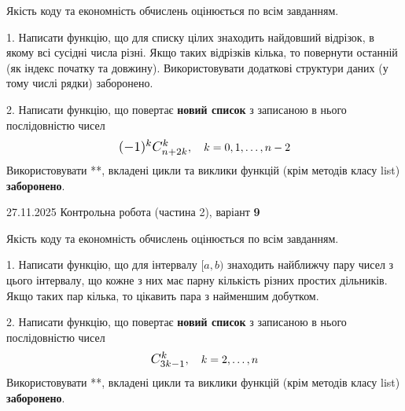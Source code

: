 \documentclass[11pt, ukrainian]{article}
\begin{document}
{{{{{{{%

{
\begin {large}
Якість коду та економність обчислень оцінюється по всім завданням.


1. Написати функцію, що для списку цілих знаходить найдовший відрізок, в якому всі сусідні числа різні. Якщо таких відрізків кілька, то повернути останній (як індекс початку та довжину). Використовувати додаткові структури даних (у тому числі рядки) заборонено.


2. 
Написати функцію, що повертає \textbf{новий список} з записаною в нього послідовністю чисел
$$\scalebox{1.2}{$(-1)^{k}C_{n+2k}^{k}$}, \quad k=0,1,\ldots,n-2$$
Використовувати **, вкладені цикли та виклики функцій (крім методів класу list) \textbf{заборонено}.

\end{large}
\newpage
{{27.11.2025 Контрольна робота  (частина 2), варіант  \No \textbf { 9 }\par}}


{
\begin {large}
Якість коду та економність обчислень оцінюється по всім завданням.


1. Написати функцію, що для інтервалу $[a, b)$ знаходить найближчу пару чисел з цього інтервалу, що кожне з них має парну кількість різних простих дільників. Якщо таких пар кілька, то цікавить пара з найменшим добутком.


2. 
Написати функцію, що повертає \textbf{новий список} з записаною в нього послідовністю чисел
$$\scalebox{1.2}{$C_{3k-1}^{k}$}, \quad k=2,\ldots,n$$
Використовувати **, вкладені цикли та виклики функцій (крім методів класу list) \textbf{заборонено}.


\end{large}}}}}}}}}}
\end{document}
